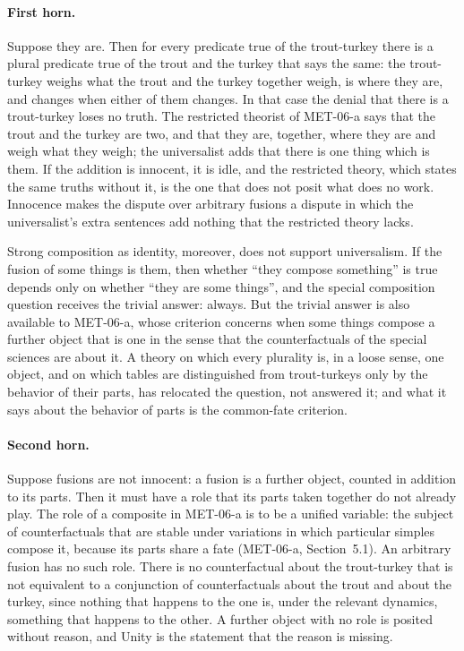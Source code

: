 \documentclass{situationist-preprint}
\begin{document}
\paragraph{First horn.} Suppose they are. Then for every predicate true of the trout-turkey there is a plural predicate true of the trout and the turkey that says the same: the trout-turkey weighs what the trout and the turkey together weigh, is where they are, and changes when either of them changes. In that case the denial that there is a trout-turkey loses no truth. The restricted theorist of MET-06-a says that the trout and the turkey are two, and that they are, together, where they are and weigh what they weigh; the universalist adds that there is one thing which is them. If the addition is innocent, it is idle, and the restricted theory, which states the same truths without it, is the one that does not posit what does no work. Innocence makes the dispute over arbitrary fusions a dispute in which the universalist's extra sentences add nothing that the restricted theory lacks.

Strong composition as identity, moreover, does not support universalism. If the fusion of some things is them, then whether \enquote{they compose something} is true depends only on whether \enquote{they are some things}, and the special composition question receives the trivial answer: always. But the trivial answer is also available to MET-06-a, whose criterion concerns when some things compose a further object that is one in the sense that the counterfactuals of the special sciences are about it. A theory on which every plurality is, in a loose sense, one object, and on which tables are distinguished from trout-turkeys only by the behavior of their parts, has relocated the question, not answered it; and what it says about the behavior of parts is the common-fate criterion.

\paragraph{Second horn.} Suppose fusions are not innocent: a fusion is a further object, counted in addition to its parts. Then it must have a role that its parts taken together do not already play. The role of a composite in MET-06-a is to be a unified variable: the subject of counterfactuals that are stable under variations in which particular simples compose it, because its parts share a fate (MET-06-a, Section~5.1). An arbitrary fusion has no such role. There is no counterfactual about the trout-turkey that is not equivalent to a conjunction of counterfactuals about the trout and about the turkey, since nothing that happens to the one is, under the relevant dynamics, something that happens to the other. A further object with no role is posited without reason, and Unity is the statement that the reason is missing.
\end{document}
